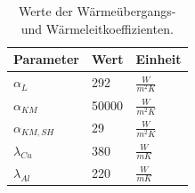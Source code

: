 \begin{table}[h!]
\centering
\caption{Werte der Wärmeübergangs- und Wärmeleitkoeffizienten.}
\label{tab:Werte der Wärmeübergangs- und Wärmeleitzahlen}
\renewcommand{\arraystretch}{1.2}
\begin{tabular}{|l|l|l|}

\hline
Parameter        & Wert  & Einheit           \\ \hline
$\alpha_{L}$     & 292   & $\frac{W}{m^2 K}$ \\
$\alpha_{KM}$    & 50000 & $\frac{W}{m^2 K}$ \\
$\alpha_{KM,SH}$ & 29    & $\frac{W}{m^2 K}$ \\
$\lambda_{Cu}$   & 380   & $\frac{W}{m K}$   \\
$\lambda_{Al}$   & 220   & $\frac{W}{m K}$   \\ \hline
\end{tabular}
\end{table}

